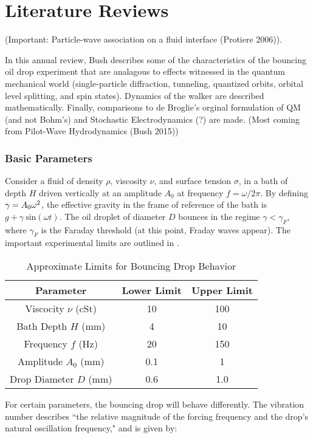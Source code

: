 	\section{Literature Reviews}
	
(Important: Particle-wave association on a fluid interface (Protiere 2006)).

	    In this annual review, Bush describes some of the characteristics of the bouncing oil drop experiment that are analagous to effects witnessed in the quantum mechanical world (single-particle diffraction, tunneling, quantized orbits, orbital level splitting, and spin states). Dynamics of the walker are described mathematically. Finally, comparisons to de Broglie's orginal formulation of QM (and not Bohm's) and Stochastic Electrodynamics (?) are made. (Most coming from Pilot-Wave Hydrodynamics (Bush 2015))
	    \subsubsection{Basic Parameters}
	       Consider a fluid of density $\rho$, viscosity $\nu$, and surface tension $\sigma$, in a bath of depth $H$ driven vertically at an amplitude $A_0$ at frequency $f=\omega/{2\pi}$. By defining $\mathnormal{\gamma}=A_0\omega^2$, the effective gravity in the frame of reference of the bath is $g+\gamma~\mathrm{sin}(\omega t)$. The oil droplet of diameter $D$ bounces in the regime $\gamma<\gamma_F$, where $\gamma_F$ is the Faraday threshold (at this point, Fraday waves appear). The important experimental limits are outlined in . 
	       \begin{table}[htdp] 
\caption[Basic Table 1]{Approximate Limits for Bouncing Drop Behavior} 
\begin{center} 
\begin{tabular}{c c c} 
\toprule 
  Parameter &  Lower Limit & Upper Limit \\
  \midrule
Viscocity $\nu$ (cSt) & 10 & 100 \\ 
Bath Depth $H$ (mm) & 4 & 10 \\
Frequency $f$ (Hz) & 20 & 150 \\
Amplitude $A_0$ (mm) & 0.1 & 1 \\
Drop Diameter $D$ (mm) & 0.6 & 1.0 \\
\bottomrule 
\end{tabular}
\end{center}
\label{approxlimits} 
\end{table}	

For certain parameters, the bouncing drop will behave differently. The vibration number describes ``the relative magnitude of the forcing frequency and the drop's natural oscillation frequency," and is given by:
	       	      
